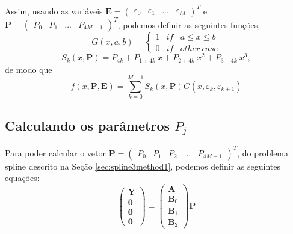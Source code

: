 \documentclass[a4paper,10pt]{article}
\begin{document}
Assim, usando as variáveis 
$\mathbf{E}=\left(\begin{matrix}\varepsilon_0 & \varepsilon_1 & ...  & \varepsilon_{M}\end{matrix}\right)^T$ e
$\mathbf{P}=\left(\begin{matrix}P_0 & P_1 & ...  & P_{4M-1}\end{matrix}\right)^T$,
podemos definir as seguintes funções,
\begin{equation}
 G(x,a,b)= \left\{\begin{matrix}
1 & if &  a \leq x \leq b \\ 
0 & if & other~case
\end{matrix}\right.
\end{equation}
\begin{equation}
 S_k(x,\mathbf{P})=P_{4k}+P_{1+4k}~x+P_{2+4k}~x^2+P_{3+4k}~x^3,
\end{equation}
de modo que
\begin{equation}
 f(x,\mathbf{P},\mathbf{E})=\sum_{k=0}^{M-1} S_k(x,\mathbf{P})G(x,\varepsilon_{k},\varepsilon_{k+1})  
\end{equation}

\subsection{Calculando os parâmetros $P_j$}

Para poder calcular o vetor $\mathbf{P}=\left(\begin{matrix}P_0 & P_1 & P_2 & ...  & P_{4M-1}\end{matrix}\right)^T$, 
do problema spline descrito  na Seção \ref{sec:spline3method1}, 
podemos definir as seguintes equações:
\begin{equation}
\left(\begin{matrix}
\mathbf{Y} \\
\mathbf{0} \\
\mathbf{0} \\
\mathbf{0} 
\end{matrix}\right)
=\left(\begin{matrix}
\mathbf{A} \\
\mathbf{B}_0 \\
\mathbf{B}_1 \\
\mathbf{B}_2 
\end{matrix}\right) \mathbf{P}
\end{equation}
\end{document}
